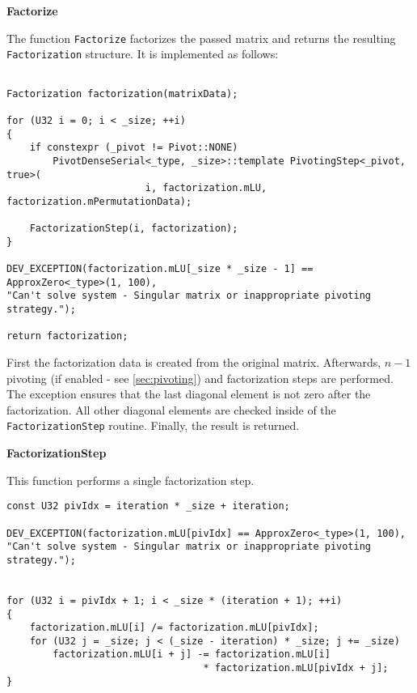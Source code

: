 \vspace{1cm}
\textbf{Factorize}
\vspace{0.5cm}

The function \texttt{Factorize} factorizes the passed matrix and returns the resulting \texttt{Factorization} structure.
It is implemented as follows:
\begin{verbatim}

Factorization factorization(matrixData);

for (U32 i = 0; i < _size; ++i)
{
    if constexpr (_pivot != Pivot::NONE)
        PivotDenseSerial<_type, _size>::template PivotingStep<_pivot, true>(
                        i, factorization.mLU, factorization.mPermutationData);
                            
    FactorizationStep(i, factorization);
}
    
DEV_EXCEPTION(factorization.mLU[_size * _size - 1] == ApproxZero<_type>(1, 100),
"Can't solve system - Singular matrix or inappropriate pivoting strategy.");

return factorization;
\end{verbatim}

First the factorization data is created from the original matrix.
Afterwards, $n-1$ pivoting (if enabled - see \cref{sec:pivoting}) and factorization steps are performed.
The exception ensures that the last diagonal element is not zero after the factorization.
All other diagonal elements are checked inside of the \texttt{FactorizationStep} routine.
Finally, the result is returned.





\vspace{1cm}
\textbf{FactorizationStep}
\vspace{0.5cm}

This function performs a single factorization step.

\begin{verbatim}
const U32 pivIdx = iteration * _size + iteration;

DEV_EXCEPTION(factorization.mLU[pivIdx] == ApproxZero<_type>(1, 100),
"Can't solve system - Singular matrix or inappropriate pivoting strategy.");


for (U32 i = pivIdx + 1; i < _size * (iteration + 1); ++i)
{
    factorization.mLU[i] /= factorization.mLU[pivIdx];
    for (U32 j = _size; j < (_size - iteration) * _size; j += _size)
        factorization.mLU[i + j] -= factorization.mLU[i] 
                                  * factorization.mLU[pivIdx + j];
}
\end{verbatim}

